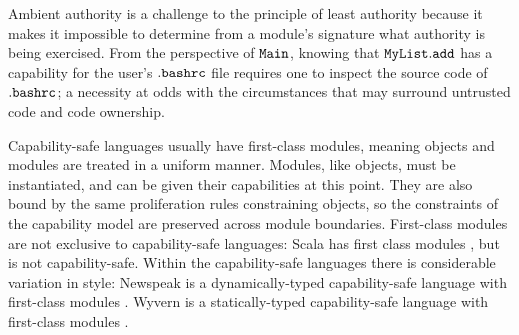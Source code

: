 Ambient authority is a challenge to the principle of least authority because it makes it impossible to determine from a module's signature what authority is being exercised. From the perspective of $\mathtt{Main}$, knowing that $\mathtt{MyList.add}$ has a capability for the user's $\mathtt{.bashrc}$ file requires one to inspect the source code of $\mathtt{.bashrc}$; a necessity at odds with the circumstances that may surround untrusted code and code ownership.

Capability-safe languages usually have first-class modules, meaning objects and modules are treated in a uniform manner. Modules, like objects, must be instantiated, and can be given their capabilities at this point. They are also bound by the same proliferation rules constraining objects, so the constraints of the capability model are preserved across module boundaries. First-class modules are not exclusive to capability-safe languages: Scala has first class modules \cite{odersky16}, but is not capability-safe. Within the capability-safe languages there is considerable variation in style: Newspeak is a dynamically-typed capability-safe language with first-class modules \cite{bracha10}. Wyvern is a statically-typed capability-safe language \cite{nistor13} with first-class modules \cite{kurilova16}.

